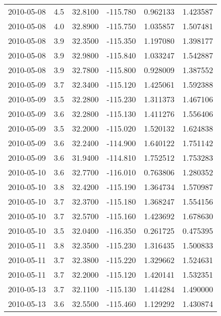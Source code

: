 \begin{tabular}{lrrrrr}
2010-05-08 &       4.5 &  32.8100 &  -115.780 &         0.962133 &         1.423587 \\
2010-05-08 &       4.0 &  32.8900 &  -115.750 &         1.035857 &         1.507481 \\
2010-05-08 &       3.9 &  32.3500 &  -115.350 &         1.197080 &         1.398177 \\
2010-05-08 &       3.9 &  32.9800 &  -115.840 &         1.033247 &         1.542887 \\
2010-05-08 &       3.9 &  32.7800 &  -115.800 &         0.928009 &         1.387552 \\
2010-05-09 &       3.7 &  32.3400 &  -115.120 &         1.425061 &         1.592388 \\
2010-05-09 &       3.5 &  32.2800 &  -115.230 &         1.311373 &         1.467106 \\
2010-05-09 &       3.6 &  32.2800 &  -115.130 &         1.411276 &         1.556406 \\
2010-05-09 &       3.5 &  32.2000 &  -115.020 &         1.520132 &         1.624838 \\
2010-05-09 &       3.6 &  32.2400 &  -114.900 &         1.640122 &         1.751142 \\
2010-05-09 &       3.6 &  31.9400 &  -114.810 &         1.752512 &         1.753283 \\
2010-05-10 &       3.6 &  32.7700 &  -116.010 &         0.763806 &         1.280352 \\
2010-05-10 &       3.8 &  32.4200 &  -115.190 &         1.364734 &         1.570987 \\
2010-05-10 &       3.7 &  32.3700 &  -115.180 &         1.368247 &         1.554156 \\
2010-05-10 &       3.7 &  32.5700 &  -115.160 &         1.423692 &         1.678630 \\
2010-05-10 &       3.5 &  32.0400 &  -116.350 &         0.261725 &         0.475395 \\
2010-05-11 &       3.8 &  32.3500 &  -115.230 &         1.316435 &         1.500833 \\
2010-05-11 &       3.7 &  32.3800 &  -115.220 &         1.329662 &         1.524631 \\
2010-05-11 &       3.7 &  32.2000 &  -115.120 &         1.420141 &         1.532351 \\
2010-05-13 &       3.7 &  32.1100 &  -115.130 &         1.414284 &         1.490000 \\
2010-05-13 &       3.6 &  32.5500 &  -115.460 &         1.129292 &         1.430874 \\

\end{tabular}

